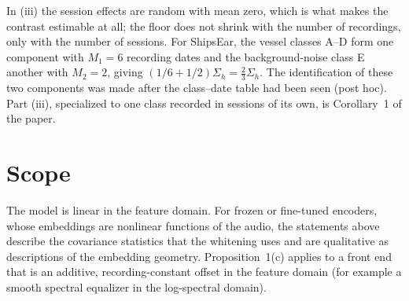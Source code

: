 \documentclass[10pt]{article}
\begin{document}
\noindent In (iii) the session effects are random with mean zero, which is what makes the contrast estimable at all; the floor does not shrink with the number of recordings, only with the number of sessions. For ShipsEar, the vessel classes A--D form one component with $M_1=6$ recording dates and the background-noise class E another with $M_2=2$, giving $(1/6+1/2)\Sigma_h=\tfrac23\Sigma_h$. The identification of these two components was made after the class--date table had been seen (post hoc). Part (iii), specialized to one class recorded in sessions of its own, is Corollary~1 of the paper.

\section{Scope}
The model is linear in the feature domain. For frozen or fine-tuned encoders, whose embeddings are nonlinear functions of the audio, the statements above describe the covariance statistics that the whitening uses and are qualitative as descriptions of the embedding geometry. Proposition~1(c) applies to a front end that is an additive, recording-constant offset in the feature domain (for example a smooth spectral equalizer in the log-spectral domain).
\end{document}
